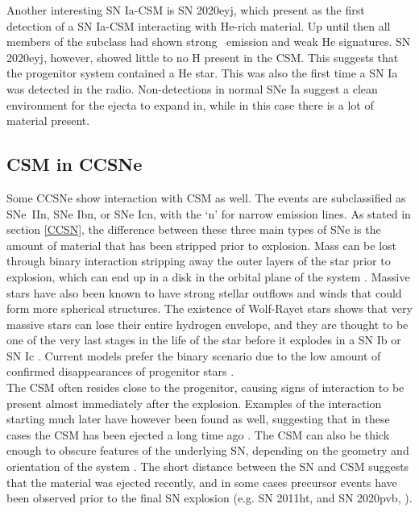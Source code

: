 \documentclass[a4paper,oneside,12pt, class=Latex/Classes/PhDthesisPSnPDF, crop=false]{standalone}
\begin{document}
Another interesting SN Ia-CSM is SN 2020eyj, which \citet{Kool_He_CSM} present as the first detection of a SN Ia-CSM interacting with He-rich material. Up until then all members of the subclass had shown strong \Halpha\ emission and weak He signatures. SN 2020eyj, however, showed little to no H present in the CSM. This suggests that the progenitor system contained a He star. This was also the first time a SN Ia was detected in the radio. Non-detections in normal SNe Ia suggest a clean environment for the ejecta to expand in, while in this case there is a lot of material present.


\subsection{CSM in CCSNe}
Some CCSNe show interaction with CSM as well. The events are subclassified as SNe~IIn, SNe Ibn, or SNe Icn, with the `n' for narrow emission lines. As stated in section \ref{CCSN}, the difference between these three main types of SNe is the amount of material that has been stripped prior to explosion. Mass can be lost through binary interaction stripping away the outer layers of the star prior to explosion, which can end up in a disk in the orbital plane of the system \citep{Ic_binary_progenitors}. Massive stars have also been known to have strong stellar outflows and winds that could form more spherical structures. The existence of Wolf-Rayet stars shows that very massive stars can lose their entire hydrogen envelope, and they are thought to be one of the very last stages in the life of the star before it explodes in a SN Ib or SN Ic \citep{WR_as_progenitors, 2019hgp}. Current models prefer the binary scenario due to the low amount of confirmed disappearances of progenitor stars \citep{CCSN_disappeared_progenitor}.\\

The CSM often resides close to the progenitor, causing signs of interaction to be present almost immediately after the explosion. Examples of the interaction starting much later have however been found as well, suggesting that in these cases the CSM has been ejected a long time ago \citep{2008iy, late-CSM_IIn_Spitzer}. The CSM can also be thick enough to obscure features of the underlying SN, depending on the geometry and orientation of the system \citep{1994W, PTF11iqb}. The short distance between the SN and CSM suggests that the material was ejected recently, and in some cases precursor events have been observed prior to the final SN explosion (e.g. SN 2011ht, \citealt{2011ht} and SN 2020pvb, \citealt{2020pvb}).
\end{document}
